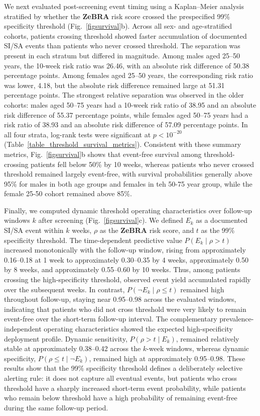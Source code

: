 \documentclass[onecolumn, compsoc,11pt]{IEEEtran}
\def\zebra{\textbf{ZeBRA}\xspace}
\begin{document}
We next evaluated post-screening event timing using a Kaplan--Meier analysis stratified by whether the \zebra risk score crossed the prespecified 99\% specificity threshold (Fig.~\ref{figsurvival}b). Across all sex- and age-stratified cohorts, patients crossing threshold showed faster accumulation of documented SI/SA events than patients who never crossed threshold. The separation was present in each stratum but differed in magnitude. Among males aged 25--50 years, the 10-week risk ratio was 26.46, with an absolute risk difference of 50.38 percentage points. Among females aged 25--50 years, the corresponding risk ratio was lower, 4.18, but the absolute risk difference remained large at 51.31 percentage points. The strongest relative separation was observed in the older cohorts: males aged 50--75 years had a 10-week risk ratio of 38.95 and an absolute risk difference of 55.37 percentage points, while females aged 50--75 years had a risk ratio of 38.93 and an absolute risk difference of 57.09 percentage points. In all four strata, log-rank tests were significant at $p < 10^{-20}$ (Table~\ref{table_threshold_survival_metrics}). Consistent with these summary metrics, Fig.~\ref{figsurvival}b shows that event-free survival among threshold-crossing patients fell below 50\% by 10 weeks, whereas patients who never crossed threshold remained largely event-free, with survival probabilities generally above 95\% for males in both age groups and females in teh 50-75 year group, while the female 25-50 cohort remained above 85\%.


Finally, we computed dynamic threshold operating characteristics over follow-up windows \(k\) after screening (Fig.~\ref{figsurvival}c). We defined \(E_k\) as a documented SI/SA event within \(k\) weeks, \(\rho\) as the \zebra risk score, and \(t\) as the 99\% specificity threshold. The time-dependent predictive value \(P(E_k \mid \rho > t)\) increased monotonically with the follow-up window, rising from approximately 0.16--0.18 at 1 week to approximately 0.30--0.35 by 4 weeks, approximately 0.50 by 8 weeks, and approximately 0.55--0.60 by 10 weeks. Thus, among patients crossing the high-specificity threshold, observed event yield accumulated rapidly over the subsequent weeks. In contrast, \(P(\neg E_k \mid \rho \leq t)\) remained high throughout follow-up, staying near 0.95--0.98 across the evaluated windows, indicating that patients who did not cross threshold were very likely to remain event-free over the short-term follow-up interval.
The complementary prevalence-independent operating characteristics showed the expected high-specificity deployment profile. Dynamic sensitivity, \(P(\rho > t \mid E_k)\), remained relatively stable at approximately 0.38--0.42 across the \(k\)-week windows, whereas dynamic specificity, \(P(\rho \leq t \mid \neg E_k)\), remained high at approximately 0.95--0.98. These results show that the 99\% specificity threshold defines a deliberately selective alerting rule: it does not capture all eventual events, but patients who cross threshold have a sharply increased short-term event probability, while patients who remain below threshold have a high probability of remaining event-free during the same follow-up period.
\end{document}
